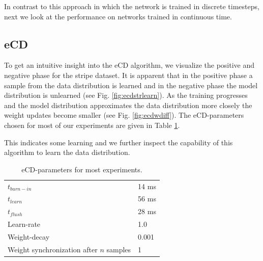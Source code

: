 In contrast to this approach in which the network is trained in discrete timesteps, next we look at the performance on networks trained in continuous time.  

\subsection{eCD} \label{c:ecdexp}

To get an intuitive insight into the eCD algorithm, we visualize the positive and negative phase for the stripe dataset.
It is apparent that in the positive phase a sample from the data distribution is learned and in the negative phase the model distribution is unlearned (see Fig. \ref{fig:ecdstrlearn}).
As the training progresses and the model distribution approximates the data distribution more closely the weight updates become smaller (see Fig. \ref{fig:ecdwdiff}). 
The eCD-parameters chosen for most of our experiments are given in Table \ref{tab:ecdrunparam}.

This indicates some learning and we further inspect the capability of this algorithm to learn the data distribution.

\begin{table}[]
\caption{eCD-parameters for most experiments.}
\centering
\label{tab:ecdrunparam}
\begin{tabular}{|ll|}
\hline
$t_{burn-in}$    	& 14 ms 		    \\
$t_{learn}$    		& 56 ms 		     \\
$t_{flush}$    		& 28 ms		             \\
Learn-rate     		& 1.0 		                 \\
Weight-decay    	& 0.001		              \\
Weight synchronization after $n$ samples     	& 1		              \\\hline
\end{tabular}
\end{table}


